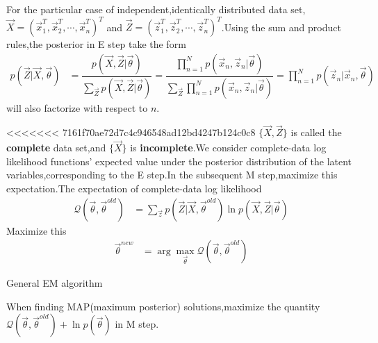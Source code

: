 For the particular case of independent,identically distributed data set,$\vec{X}=(\vec{x}_1^T,\vec{x}_2^T,\cdots,\vec{x}_n^T)^T$ and $\vec{Z}=(\vec{z}_1^T,\vec{z}_2^T,\cdots,\vec{z}_n^T)^T$.Using the sum and product rules,the posterior in E step take the form
\begin{align}
p(\vec{Z}|\vec{X},\vec{\theta}) &= \dfrac{p(\vec{X},\vec{Z}|\vec{\theta})}{\sum_{\vec{Z}}p(\vec{X},\vec{Z}|\vec{\theta})}
=\dfrac{\prod_{n=1}^{N}p(\vec{x}_n,\vec{z}_n|\vec{\theta})}{\sum_{\vec{Z}}\prod_{n=1}^{N}p(\vec{x}_n,\vec{z}_n|\vec{\theta})}
=\prod_{n=1}^{N}p(\vec{z}_n|\vec{x}_n,\vec{\theta})
\end{align}
will also factorize with respect to $n$.

<<<<<<< 7161f70ae72d7c4c946548ad12bd4247b124c0c8
$\{\vec{X},\vec{Z}\}$ is called the \textbf{complete} data set,and $\{\vec{X}\}$ is \textbf{incomplete}.We consider complete-data log likelihood functions' expected value under the posterior distribution of the latent variables,corresponding to the E step.In the subsequent M step,maximize this expectation.The expectation of complete-data log likelihood
\begin{align}
\mathcal{Q}(\vec{\theta},\vec{\theta}^{old}) &=
\sum_{\vec{z}}p(\vec{Z}|\vec{X},\vec{\theta}^{old})\ln p(\vec{X},\vec{Z}|\vec{\theta})
\end{align}
Maximize this
\begin{align}
\vec{\theta}^{new} &=\arg\max\limits_{\vec{\theta}}\mathcal{Q}(\vec{\theta},\vec{\theta}^{old})
\end{align}
\begin{algorithm}
	\label{General EM algorithm}
	\caption{General EM algorithm}
	\DontPrintSemicolon
\end{algorithm}
When finding MAP(maximum posterior) solutions,maximize the quantity $\mathcal{Q}(\vec{\theta},\vec{\theta}^{old})+\ln p(\vec{\theta})$ in M step.

